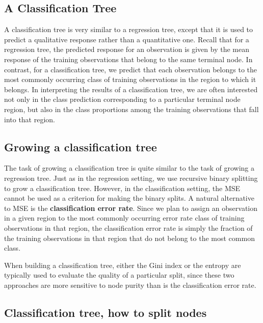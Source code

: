 \documentclass[%
oneside,                 %
final,                   %
10pt]{article}
\begin{document}
\noindent




\subsection{A Classification Tree}

A classification tree is very similar to a regression tree, except
that it is used to predict a qualitative response rather than a
quantitative one. Recall that for a regression tree, the predicted
response for an observation is given by the mean response of the
training observations that belong to the same terminal node. In
contrast, for a classification tree, we predict that each observation
belongs to the most commonly occurring class of training observations
in the region to which it belongs. In interpreting the results of a
classification tree, we are often interested not only in the class
prediction corresponding to a particular terminal node region, but
also in the class proportions among the training observations that
fall into that region.  

\subsection{Growing a classification tree}

The task of growing a
classification tree is quite similar to the task of growing a
regression tree. Just as in the regression setting, we use recursive
binary splitting to grow a classification tree. However, in the
classification setting, the MSE cannot be used as a criterion for making
the binary splits.  A natural alternative to MSE is the \textbf{classification
error rate}. Since we plan to assign an observation in a given region
to the most commonly occurring error rate class of training
observations in that region, the classification error rate is simply
the fraction of the training observations in that region that do not
belong to the most common class. 

When building a classification tree, either the Gini index or the
entropy are typically used to evaluate the quality of a particular
split, since these two approaches are more sensitive to node purity
than is the classification error rate. 


\subsection{Classification tree, how to split nodes}
\end{document}
